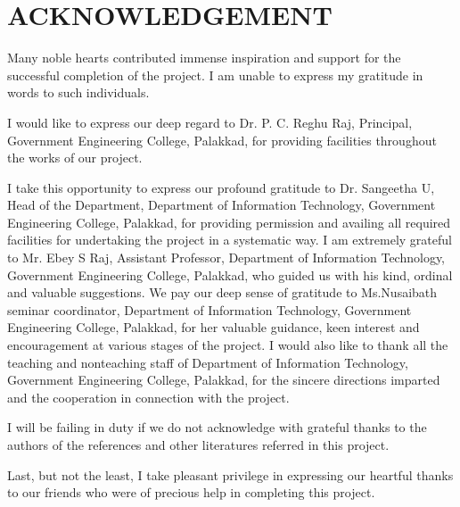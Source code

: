 \chapter*{\centering ACKNOWLEDGEMENT}
\thispagestyle{empty}
Many noble hearts contributed immense inspiration and support for the successful completion of the project. I am unable to express my gratitude in words to such individuals.

I would like to express our deep regard to Dr. P. C. Reghu Raj, Principal, Government Engineering College, Palakkad, for providing facilities throughout the works of our project. 

I take this opportunity to express our profound gratitude to Dr. Sangeetha U, Head of the Department, Department of Information Technology, Government Engineering College, Palakkad, for providing permission and availing all required facilities for undertaking the project in a systematic way. I am extremely grateful to Mr. Ebey S Raj, Assistant Professor, Department of Information Technology, Government Engineering College, Palakkad, who guided us with his kind, ordinal and valuable suggestions. We pay our deep sense of gratitude to Ms.Nusaibath seminar coordinator, Department of Information Technology, Government Engineering College, Palakkad, for her valuable guidance, keen interest and encouragement at various stages of the project. I would also like to thank all the teaching and nonteaching staff of Department of Information Technology, Government Engineering College, Palakkad, for the sincere directions imparted and the cooperation in connection with the project. 

I will be failing in duty if we do not acknowledge with grateful thanks to the authors of the references and other literatures referred in this project. 

Last, but not the least, I take pleasant privilege in expressing our heartful thanks to our friends who were of precious help in completing this project.    